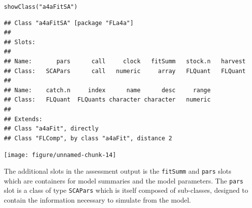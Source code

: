 \documentclass[a4paper,english,10pt]{article}\usepackage[]{graphicx}\usepackage[]{color}
\makeatletter
\newcommand{\hlstr}[1]{\textcolor[rgb]{0.2,0.2,0.2}{#1}}%
\newcommand{\hlstd}[1]{\textcolor[rgb]{0,0,0}{#1}}%
\newcommand{\hlkwd}[1]{\textcolor[rgb]{0.361,0.506,0.596}{#1}}%
\newenvironment{kframe}{%
 \def\at@end@of@kframe{}%
 \ifinner\ifhmode%
  \def\at@end@of@kframe{\end{minipage}}%
  \begin{minipage}{\columnwidth}%
 \fi\fi%
 \def\FrameCommand##1{\hskip\@totalleftmargin \hskip-\fboxsep
 \colorbox{shadecolor}{##1}\hskip-\fboxsep
     \hskip-\linewidth \hskip-\@totalleftmargin \hskip\columnwidth}%
 \MakeFramed {\advance\hsize-\width
   \@totalleftmargin\z@ \linewidth\hsize
   \@setminipage}}%
 {\par\unskip\endMakeFramed%
 \at@end@of@kframe}
\newenvironment{knitrout}{}{} %
\makeatother
\begin{document}
\begin{knitrout}
\color{fgcolor}\begin{kframe}
\begin{alltt}
\hlkwd{showClass}\hlstd{(}\hlstr{"a4aFitSA"}\hlstd{)}
\end{alltt}
\begin{verbatim}
## Class "a4aFitSA" [package "FLa4a"]
## 
## Slots:
##                                                                   
## Name:       pars      call     clock   fitSumm   stock.n   harvest
## Class:   SCAPars      call   numeric     array   FLQuant   FLQuant
##                                                         
## Name:    catch.n     index      name      desc     range
## Class:   FLQuant  FLQuants character character   numeric
## 
## Extends: 
## Class "a4aFit", directly
## Class "FLComp", by class "a4aFit", distance 2
\end{verbatim}
\end{kframe}
\end{knitrout}


\begin{knitrout}
\color{fgcolor}

{\centering \texttt{[image: figure/unnamed-chunk-14]} 

}



\end{knitrout}


The additional slots in the assessment output is the \texttt{fitSumm} and \texttt{pars} slots which are containers for model summaries and the model parameters.  The \texttt{pars} slot is a class of type \texttt{SCAPars} which is itself composed of sub-classes, designed to contain the information necessary to simulate from the model.
\end{document}
